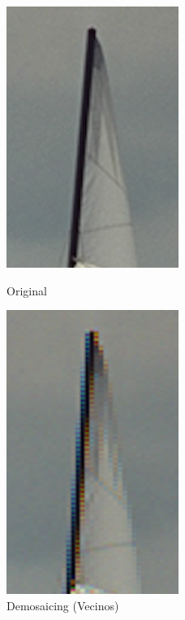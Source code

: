 {

\begin{figure}[hb]
\begin{center}
       \includegraphics[width=0.5\textwidth]{imagenes/img5_zippering_original.png}
        \caption{Original}
        \end{center}
\endminipage
{}
\begin{center}
       \includegraphics[width=0.5\textwidth]{imagenes/img5_zippering.png}
        \caption{Demosaicing (Vecinos)}
         \end{center}
\endminipage
\end{figure}
\newpage

}
